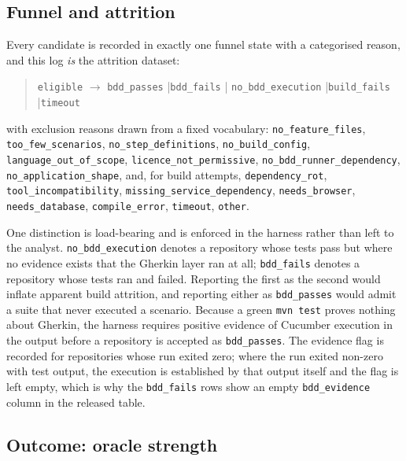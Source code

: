 \subsection{Funnel and attrition}

Every candidate is recorded in exactly one funnel state with a categorised reason, and this log
\emph{is} the attrition dataset:

\begin{quote}
\texttt{eligible} $\rightarrow$ \texttt{bdd\_passes} \quad|\quad \texttt{bdd\_fails} \quad|\quad
\texttt{no\_\allowbreak bdd\_\allowbreak execution} \quad|\quad \texttt{build\_fails} \quad|\quad \texttt{timeout}
\end{quote}

\begin{sloppypar}
with exclusion reasons drawn from a fixed vocabulary: \texttt{no\_feature\_files},
\texttt{too\_few\_scenarios}, \texttt{no\_step\_definitions}, \texttt{no\_build\_config},
\texttt{language\_out\_of\_scope}, \texttt{licence\_\allowbreak not\_\allowbreak permissive},
\texttt{no\_\allowbreak bdd\_\allowbreak runner\_\allowbreak dependency}, \texttt{no\_application\_shape}, and, for build attempts,
\texttt{dependency\_rot}, \texttt{tool\_incompatibility}, \texttt{missing\_service\_dependency},
\texttt{needs\_browser}, \texttt{needs\_database}, \texttt{compile\_error}, \texttt{timeout},
\texttt{other}.
\end{sloppypar}

One distinction is load-bearing and is enforced in the harness rather than left to the analyst.
\texttt{no\_\allowbreak bdd\_\allowbreak execution} denotes a repository whose tests pass but where no evidence exists that
the Gherkin layer ran at all; \texttt{bdd\_fails} denotes a repository whose tests ran and failed.
Reporting the first as the second would inflate apparent build attrition, and reporting either as
\texttt{bdd\_passes} would admit a suite that never executed a scenario. Because a green
\texttt{mvn test} proves nothing about Gherkin, the harness requires positive evidence of Cucumber
execution in the output before a repository is accepted as \texttt{bdd\_passes}. The evidence flag is
recorded for repositories whose run exited zero; where the run exited non-zero with test output, the
execution is established by that output itself and the flag is left empty, which is why the
\texttt{bdd\_fails} rows show an empty \texttt{bdd\_evidence} column in the released table.

\subsection{Outcome: oracle strength}

